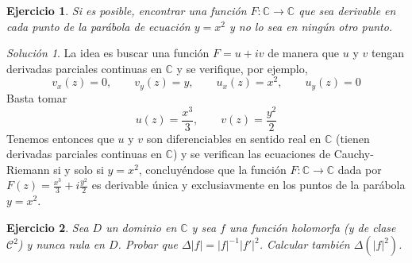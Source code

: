 \documentclass[11pt]{report}
\newcommand{\C}{\mathbb C}
\newcommand{\pars}[1]{\left( #1 \right)} %
\newtheorem{exercise}{Ejercicio}
\theoremstyle{remark}
\newtheorem*{resolution}{Solución}
\begin{document}
\begin{exercise}
Si es posible, encontrar una función $F \colon \C \to \C$ que sea derivable en cada punto de la parábola de ecuación $y = x^2$ y no lo sea en ningún otro punto.
\end{exercise}

\begin{resolution}
La idea es buscar una función $F=u+iv$ de manera que $u$ y $v$ tengan derivadas parciales continuas en $\C$ y se verifique, por ejemplo,
\[v_x(z)=0, \qquad v_y(z) = y, \qquad u_x(z) =x^2, \qquad u_y(z) = 0\]
Basta tomar
\[u(z) = \frac{x^3}{3}, \qquad v(z) = \frac{y^2}{2}\]
Tenemos entonces que $u$ y $v$ son diferenciables en sentido real en $\C$ (tienen derivadas parciales continuas en $\C$) y se verifican las ecuaciones de Cauchy-Riemann si y solo si $y = x^2$, concluyéndose que la función $F \colon \C \to \C$ dada por $F(z) = \frac{x^3}{3}+i\frac{y^2}{2}$ es derivable única y exclusiavmente en los puntos de la parábola $y = x^2$.
\end{resolution}

\begin{exercise}
Sea $D$ un dominio en $\C$ y sea $f$ una función holomorfa (y de clase $\mathcal{C}^2$) y nunca nula en $D$. Probar que $\Delta |f| = |f|^{-1}|f'|^2$. Calcular también $\Delta\pars{|f|^2}$.
\end{exercise}
\end{document}
